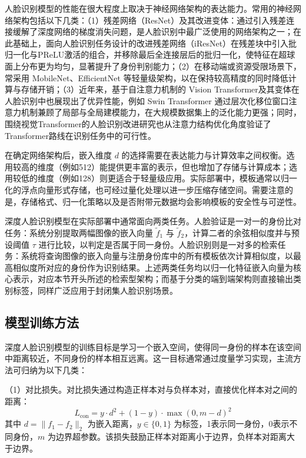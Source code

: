 人脸识别模型的性能在很大程度上取决于神经网络架构的表达能力。常用的神经网络架构包括以下几类：（1）残差网络（ResNet）\cite{he2016deep}及其改进变体：通过引入残差连接缓解了深度网络的梯度消失问题，是人脸识别中最广泛使用的网络架构之一；在此基础上，面向人脸识别任务设计的改进残差网络（iResNet）\cite{deng2019arcface}在残差块中引入批归一化与PReLU激活的组合，并移除最后全连接层后的批归一化，使特征在超球面上分布更为均匀，显著提升了身份判别能力；（2）在移动端或资源受限场景下，常采用 MobileNet\cite{howard2017mobilenets}、EfficientNet\cite{tan2019efficientnet} 等轻量级架构，以在保持较高精度的同时降低计算与存储开销；（3）近年来，基于自注意力机制的 Vision Transformer\cite{dosovitskiy2020image}及其变体在人脸识别中也展现出了优异性能，例如 Swin Transformer\cite{liu2021swin} 通过层次化移位窗口注意力机制兼顾了局部与全局建模能力，在大规模数据集上的泛化能力更强；同时，围绕视觉Transformer的人脸识别改进研究也从注意力结构优化角度验证了Transformer路线在识别任务中的可行性\cite{JSGG202308011}。

在确定网络架构后，嵌入维度 $d$ 的选择需要在表达能力与计算效率之间权衡。选用较高的维度（例如512）能提供更丰富的表示，但也增加了存储与计算成本；选用较低的维度（例如128）则更适合于轻量级应用。实际部署中，模板通常以归一化的浮点向量形式存储，也可经过量化处理以进一步压缩存储空间。需要注意的是，存储格式、归一化策略以及是否附带元数据均会影响模板的安全性与可逆性。

深度人脸识别模型在实际部署中通常面向两类任务。人脸验证是一对一的身份比对任务：系统分别提取两幅图像的嵌入向量 $\tilde{f}_1$ 与 $\tilde{f}_2$，计算二者的余弦相似度并与预设阈值 $\tau$ 进行比较，以判定是否属于同一身份。人脸识别则是一对多的检索任务：系统将查询图像的嵌入向量与注册身份库中的所有模板依次计算相似度，以最高相似度所对应的身份作为识别结果。上述两类任务均以归一化特征嵌入向量为核心表示，对应本节开头所述的检索型架构；而基于分类的端到端架构则直接输出类别标签，同样广泛应用于封闭集人脸识别场景。

\subsection{模型训练方法}

深度人脸识别模型的训练目标是学习一个嵌入空间，使得同一身份的样本在该空间中距离较近，不同身份的样本相互远离。这一目标通常通过度量学习实现\cite{wang2014learning}，主流方法可归纳为以下几类：

（1）对比损失\cite{hadsell2006dimensionality}。对比损失通过构造正样本对与负样本对，直接优化样本对之间的距离：
\begin{equation}\label{eq:contrastive_loss}
      L_{\text{con}} = y \cdot d^2 + (1-y) \cdot \max(0, m - d)^2
\end{equation}
其中 $d=\|f_1-f_2\|_2$ 为嵌入距离，$y\in\{0,1\}$ 为标签，1表示同一身份，0表示不同身份，$m$ 为边界超参数。该损失鼓励正样本对距离小于边界，负样本对距离大于边界。

